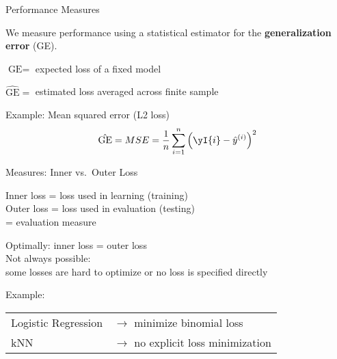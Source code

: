     \begin{frame}[c]{Performance Measures}

    We measure performance using a statistical estimator for the 
    \textbf{generalization error} (GE).

    $\text{GE} = $ expected loss of a fixed model

    $\hat{\text{GE}} = $ estimated loss averaged across finite sample

    Example: Mean squared error (L2 loss)
    \[
        \hat{\text{GE}} = MSE = \frac{1}{n} \sum_{i=1}^n \left(\yI{i} - \hat{y}^{(i)}\right)^2
    \]

    \end{frame}

    \begin{frame}[c]{Measures: Inner vs.\ Outer Loss}

    \begin{center}
        Inner loss = loss used in learning (training)\\
        Outer loss = loss used in evaluation (testing)\\
            = evaluation measure
    \end{center}

    Optimally: inner loss = outer loss\\[.5em]
    Not always possible:\\ some losses are hard to optimize or no loss is specified directly\\
    
    \bigskip

    Example:\\[.5em]
    \begin{tabular}{ll}
    Logistic Regression & $\rightarrow$ minimize binomial loss \\
    kNN & $\rightarrow$ no explicit loss minimization\\
    \end{tabular}

    \end{frame}

